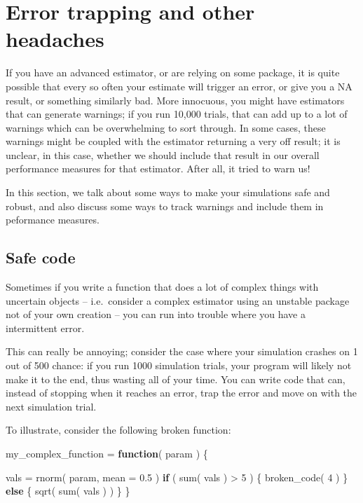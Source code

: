 \documentclass[
]{book}
\newenvironment{Shaded}{\begin{snugshade}}{\end{snugshade}}
\newcommand{\AttributeTok}[1]{\textcolor[rgb]{0.77,0.63,0.00}{#1}}
\newcommand{\ControlFlowTok}[1]{\textcolor[rgb]{0.13,0.29,0.53}{\textbf{#1}}}
\newcommand{\DecValTok}[1]{\textcolor[rgb]{0.00,0.00,0.81}{#1}}
\newcommand{\FloatTok}[1]{\textcolor[rgb]{0.00,0.00,0.81}{#1}}
\newcommand{\FunctionTok}[1]{\textcolor[rgb]{0.00,0.00,0.00}{#1}}
\newcommand{\NormalTok}[1]{#1}
\newcommand{\OtherTok}[1]{\textcolor[rgb]{0.56,0.35,0.01}{#1}}
\newcommand{\SpecialCharTok}[1]{\textcolor[rgb]{0.00,0.00,0.00}{#1}}
\begin{document}
\hypertarget{error-trapping-and-other-headaches}{%
\chapter{Error trapping and other headaches}\label{error-trapping-and-other-headaches}}

If you have an advanced estimator, or are relying on some package, it is quite possible that every so often your estimate will trigger an error, or give you a NA result, or something similarly bad.
More innocuous, you might have estimators that can generate warnings; if you run 10,000 trials, that can add up to a lot of warnings which can be overwhelming to sort through.
In some cases, these warnings might be coupled with the estimator returning a very off result; it is unclear, in this case, whether we should include that result in our overall performance measures for that estimator.
After all, it tried to warn us!

In this section, we talk about some ways to make your simulations safe and robust, and also discuss some ways to track warnings and include them in peformance measures.

\hypertarget{safe_code}{%
\section{Safe code}\label{safe_code}}

Sometimes if you write a function that does a lot of complex things with
uncertain objects -- i.e.~consider a complex estimator using an unstable package not of your own creation -- you can run into trouble where you have a intermittent error.

This can really be annoying; consider the case where your simulation crashes on 1 out of 500 chance: if you run 1000 simulation trials, your program will likely not make it to the end, thus wasting all of your time.
You can write code that can, instead of stopping when it reaches an error, trap the error and move on with the next simulation trial.

To illustrate, consider the following broken function:

\begin{Shaded}
\begin{Highlighting}[]
\NormalTok{my\_complex\_function }\OtherTok{=} \ControlFlowTok{function}\NormalTok{( param ) \{}
    
\NormalTok{    vals }\OtherTok{=} \FunctionTok{rnorm}\NormalTok{( param, }\AttributeTok{mean =} \FloatTok{0.5}\NormalTok{ )}
    \ControlFlowTok{if}\NormalTok{ ( }\FunctionTok{sum}\NormalTok{( vals ) }\SpecialCharTok{\textgreater{}} \DecValTok{5}\NormalTok{ ) \{}
        \FunctionTok{broken\_code}\NormalTok{( }\DecValTok{4}\NormalTok{ )}
\NormalTok{    \} }\ControlFlowTok{else}\NormalTok{ \{}
        \FunctionTok{sqrt}\NormalTok{( }\FunctionTok{sum}\NormalTok{( vals ) )}
\NormalTok{    \}}
\NormalTok{\}}
\end{Highlighting}
\end{Shaded}
\end{document}
